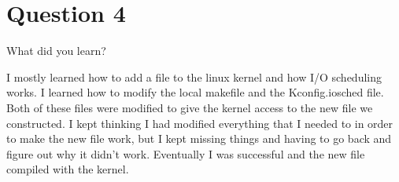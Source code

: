 \documentclass[a4paper]{article}
\begin{document}
\section{Question 4}

What did you learn?


I mostly learned how to add a file to the linux kernel and how I/O scheduling works. I learned how to modify the local makefile and the Kconfig.iosched file. Both of these files were modified to give the kernel access to the new file we constructed. I kept thinking I had modified everything that I needed to in order to make the new file work, but I kept missing things and having to go back and figure out why it didn't work. Eventually I was successful and the new file compiled with the kernel. 
\end{document}
